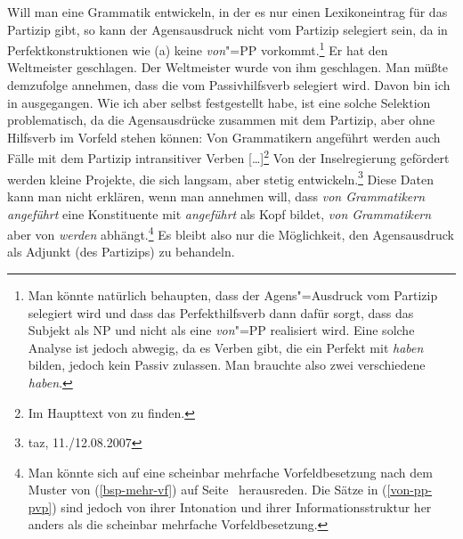 Will man eine Grammatik entwickeln, in der es nur einen Lexikoneintrag für das Partizip gibt,
so kann der Agensausdruck nicht vom Partizip selegiert sein, da in Perfektkonstruktionen
wie (a) keine \emph{von}"=PP vorkommt.\footnote{
  Man könnte natürlich behaupten, dass der Agens"=Ausdruck vom Partizip selegiert wird
  und dass das Perfekthilfsverb dann dafür sorgt, dass das Subjekt als NP und 
  nicht als eine \emph{von}"=PP realisiert wird. Eine solche Analyse ist jedoch abwegig,
  da es Verben gibt, die ein Perfekt mit \emph{haben} bilden, jedoch kein Passiv zulassen.
  \eal
  \zl
  Man brauchte also zwei verschiedene \emph{haben}.
}
\eal
\ex Er hat den Weltmeister geschlagen.
\ex Der Weltmeister wurde von ihm geschlagen.
\zl
Man müßte demzufolge annehmen, dass die \vonpp vom Passivhilfsverb selegiert wird. Davon bin ich
in  ausgegangen. Wie ich aber selbst festgestellt habe, ist eine solche Selektion problematisch,
da die Agensausdrücke zusammen mit dem Partizip, aber ohne Hilfsverb im Vorfeld stehen können:
\eal
\label{von-pp-pvp}
\ex Von Grammatikern angeführt werden auch Fälle mit dem Partizip intransitiver Verben [\ldots]\footnote{
        Im Haupttext von  zu finden.
}
\ex Von der Inselregierung gefördert werden kleine Projekte, die sich langsam, aber stetig
        entwickeln.\footnote{
          taz, 11./12.08.2007
}
\zl
Diese Daten kann man nicht erklären, wenn man annehmen will, dass \emph{von Grammatikern angeführt} eine
Konstituente mit \emph{angeführt} als Kopf bildet, \emph{von Grammatikern} aber von \emph{werden} abhängt.\footnote{
  Man könnte sich auf eine scheinbar mehrfache Vorfeldbesetzung nach dem Muster von (\ref{bsp-mehr-vf})
  auf Seite~\pageref{bsp-mehr-vf} herausreden. Die Sätze in (\ref{von-pp-pvp}) sind jedoch
  von ihrer Intonation und ihrer Informationsstruktur her anders als die scheinbar mehrfache Vorfeldbesetzung.%
}
Es bleibt also nur die Möglichkeit, den Agensausdruck als Adjunkt (des Partizips) zu behandeln.

